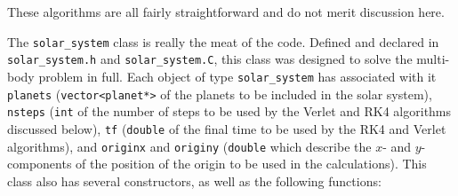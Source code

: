\documentclass[12pt]{article}
\numberwithin{equation}{section}
\begin{document}
\noindent These algorithms are all fairly straightforward and do not merit discussion here.
\par The \texttt{solar\_system} class is really the meat of the code.  Defined and declared in \texttt{solar\_system.h} and \texttt{solar\_system.C}, this class was designed to solve the multi-body problem in full.  Each object of type \texttt{solar\_system} has associated with it \texttt{planets} (\texttt{vector<planet*>} of the planets to be included in the solar system), \texttt{nsteps} (\texttt{int} of the number of steps to be used by the Verlet and RK4 algorithms discussed below), \texttt{tf} (\texttt{double} of the final time to be used by the RK4 and Verlet algorithms), and \texttt{originx} and \texttt{originy} (\texttt{double} which describe the $x$- and $y$-components of the position of the origin to be used in the calculations).  This class also has several constructors, as well as the following functions:
\end{document}
